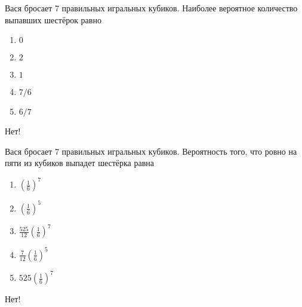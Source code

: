 \documentclass[t]{beamer}
\begin{document}
 \begin{frame} \label{7-No} 
\begin{block}{7} 

Вася бросает 7 правильных игральных кубиков. Наиболее вероятное количество выпавших шестёрок равно
     


 \end{block} 
\begin{enumerate} 
\item[] \hyperlink{7-No}{\beamergotobutton{} $0$}
\item[] \hyperlink{7-No}{\beamergotobutton{} $2$
}
\item[] \hyperlink{7-Yes}{\beamergotobutton{} $1$}
\item[] \hyperlink{7-No}{\beamergotobutton{} $7/6$}
\item[] \hyperlink{7-No}{\beamergotobutton{} $6/7$}
\end{enumerate} 

 \alert{Нет!} 
\end{frame} 


 \begin{frame} \label{8-No} 
\begin{block}{8} 

Вася бросает 7 правильных игральных кубиков. Вероятность того, что ровно на пяти из кубиков выпадет шестёрка равна
     


 \end{block} 
\begin{enumerate} 
\item[] \hyperlink{8-No}{\beamergotobutton{} $\left(\frac{1}{6}\right)^7$}
\item[] \hyperlink{8-No}{\beamergotobutton{} $\left(\frac{1}{6}\right)^5$}
\item[] \hyperlink{8-No}{\beamergotobutton{} $\frac{525}{12}\left(\frac{1}{6}\right)^7$}
\item[] \hyperlink{8-No}{\beamergotobutton{} $\frac{7}{12}\left(\frac{1}{6}\right)^5$}
\item[] \hyperlink{8-Yes}{\beamergotobutton{} $525\left(\frac{1}{6}\right)^7$}
\end{enumerate} 

 \alert{Нет!} 
\end{frame} 
\end{document}
